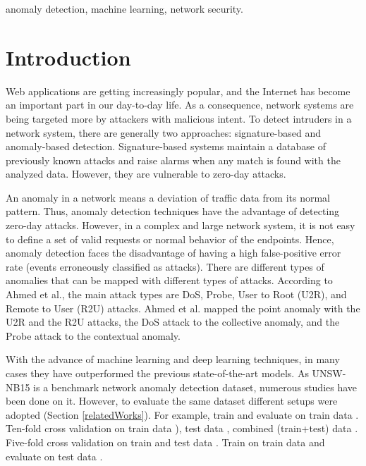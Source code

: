 \documentclass[14pt, conference]{IEEEtran}
\begin{document}
\begin{IEEEkeywords}
anomaly detection, machine learning,  network security.
\end{IEEEkeywords}

\section{Introduction}
Web applications are getting increasingly popular, and the Internet has become an important part in our day-to-day life. As a
consequence, network systems are being targeted more by attackers with malicious intent. To detect intruders in a
network system, there are generally two approaches: signature-based and anomaly-based detection. Signature-based systems maintain a database of previously known attacks and raise alarms when any match is found with the analyzed data. However, they are vulnerable to zero-day attacks.

An anomaly in a network means a deviation of traffic data from its normal pattern. Thus, anomaly detection techniques have the advantage of detecting zero-day attacks. However, in a complex and large network system,  it is not easy to define a set of valid requests or normal behavior of the endpoints. Hence, anomaly detection faces the disadvantage of having a high false-positive error rate (events erroneously classified as attacks). There are different types of anomalies that can be mapped with different types of attacks. According to Ahmed et al.\cite{ahmed2016survey}, the main attack types are DoS, Probe, User to Root (U2R), and Remote to User (R2U) attacks. Ahmed et al. \cite{ahmed2016survey} mapped the point anomaly with the U2R and the R2U attacks, the DoS attack to the collective anomaly, and the Probe attack to the contextual anomaly.

With the advance of machine learning and deep learning techniques, in many cases they have outperformed the previous state-of-the-art models. As UNSW-NB15 \cite{moustafa2015unsw} is a benchmark network anomaly detection dataset, numerous studies have been done on it.
However, to evaluate the same dataset different setups were adopted (Section \ref{relatedWorks}). For example, train and evaluate on train data \cite{mogal2017nids, Kanimozhi2019UNSW-NB15} . Ten-fold cross validation on train data \cite{suleiman2018performance, meftah2019network}), test data \cite{hanif2019intrusion}, combined (train+test) data  \cite{nawir2019effective, koroniotis2017towards}. Five-fold cross validation on train and test data \cite{meghdouri2018analysis} . Train on train data and evaluate on test data  \cite{bhamare2016feasibility, moustafa2016evaluation}.
\end{document}
